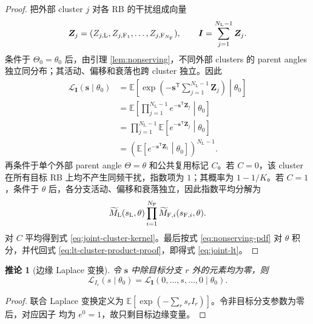 \documentclass[UTF8,a4paper,11pt]{ctexart}
\newtheorem{corollary}{推论}[section]
\newcommand{\E}{\mathbb E}
\newcommand{\NL}{N_{\mathrm L}}
\newcommand{\NF}{N_{\mathrm F}}
\newcommand{\Lcal}{\mathcal L}
\newcommand{\svec}{\bm s}
\newcommand{\Ivec}{\bm I}
\newcommand{\Zvec}{\bm Z}
\begin{document}
\begin{proof}
把外部 cluster $j$ 对各 RB 的干扰组成向量
\begin{equation}
 \Zvec_j=(Z_{j,\rm L},Z_{j,{\rm F}_1},\ldots,Z_{j,{\rm F}_{\NF}}),
 \qquad
 \Ivec=\sum_{j=1}^{\NL-1}\Zvec_j.
\end{equation}
条件于 $\Theta_0=\theta_0$ 后，由引理 \ref{lem:nonserving}，不同外部 clusters 的
parent angles 独立同分布；其活动、偏移和衰落也跨 cluster 独立。因此
\begin{equation}
\begin{split}
 \Lcal_{\Ivec}(\svec\mid\theta_0)
 &=\E\left[
 \exp\left(-\svec^{\mathsf T}\sum_{j=1}^{\NL-1}\Zvec_j\right)
 \middle|\theta_0
 \right]\\
 &=\E\left[
 \prod_{j=1}^{\NL-1}
 e^{-\svec^{\mathsf T}\Zvec_j}
 \middle|\theta_0
 \right]\\
 &=\prod_{j=1}^{\NL-1}
 \E\left[e^{-\svec^{\mathsf T}\Zvec_j}\middle|\theta_0\right]\\
 &=\left(
 \E\left[e^{-\svec^{\mathsf T}\Zvec_1}\middle|\theta_0\right]
 \right)^{\NL-1}.
 \label{eq:lt-cluster-product-proof}
\end{split}
\end{equation}
再条件于单个外部 parent angle $\Theta=\theta$ 和公共复用标记 $C$。若 $C=0$，该 cluster
在所有目标 RB 上均不产生同频干扰，指数项为 $1$；其概率为 $1-1/K$。若 $C=1$，条件于
$\theta$ 后，各分支活动、偏移和衰落独立，因此指数平均分解为
\begin{equation}
 \widetilde M_{\rm L}(s_{\rm L},\theta)
 \prod_{i=1}^{\NF}
 \widetilde M_{{\rm F},i}(s_{{\rm F},i},\theta).
\end{equation}
对 $C$ 平均得到式 \eqref{eq:joint-cluster-kernel}。最后按式
\eqref{eq:nonserving-pdf} 对 $\theta$ 积分，并代回式
\eqref{eq:lt-cluster-product-proof}，即得式 \eqref{eq:joint-lt}。
\end{proof}

\begin{corollary}[边缘 Laplace 变换]
令 $\svec$ 中除目标分支 $r$ 外的元素均为零，则
\begin{equation}
 \Lcal_{I_r}(s\mid\theta_0)
 =
 \Lcal_{\Ivec}(0,\ldots,s,\ldots,0\mid\theta_0).
 \label{eq:marginal-lt}
\end{equation}
\end{corollary}

\begin{proof}
联合 Laplace 变换定义为 $\E[\exp(-\sum_r s_rI_r)]$。令非目标分支参数为零后，对应因子
均为 $e^0=1$，故只剩目标边缘变量。
\end{proof}
\end{document}
